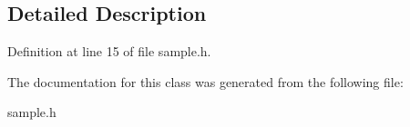 \subsection{\-Detailed \-Description}


\-Definition at line 15 of file sample.\-h.



\-The documentation for this class was generated from the following file\-:\begin{DoxyCompactItemize}
\item 
sample.\-h\end{DoxyCompactItemize}
